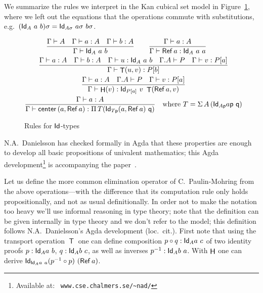 \documentclass[a4paper,USenglish,draft]{lipics}
\DeclareMathOperator{\Ref}{\mathsf{Ref}}
\DeclareMathOperator{\Transp}{\mathsf{T}}
\DeclareMathOperator{\HH}{{\sf H}}
\newcommand{\Id}{{\sf Id}}
\newcommand{\pp}{{\sf p}}
\newcommand{\qq}{{\sf q}}
\begin{document}
We summarize the rules we interpret in the Kan cubical set model in
Figure~\ref{fig:idtype}, where we left out the equations that the
operations commute with substitutions, e.g.\ $(\Id_A~a~b) \sigma =
\Id_{A \sigma}~a\sigma~ b\sigma$.
\begin{figure}[t]
  \caption{Rules for $\Id$-types\label{fig:idtype}}
  \begin{gather*}
    \frac {\Gamma \vdash A \quad \Gamma \vdash a : A \quad \Gamma \vdash
      b : A} {\Gamma \vdash \Id_A~a~b} \qquad
    \frac {\Gamma \vdash a : A} {\Gamma\vdash \Ref a:\Id_A~a~a} \qquad
    \\
    \frac {\Gamma\vdash a:A \quad \Gamma\vdash b:A \quad \Gamma\vdash
      u:\Id_A~a~b \quad \Gamma.A \vdash P \quad \Gamma\vdash v:P[a]}
    {\Gamma\vdash \Transp(u,v):P[b]}
    \\
    \frac {\Gamma \vdash a : A \quad \Gamma.A \vdash P \quad \Gamma
      \vdash v : P [a]} {\Gamma \vdash \HH
      (v):\Id_{P[a]}~v~\Transp(\Ref a,v)}
    \\
    \frac {\Gamma \vdash a : A} {\Gamma \vdash \mathsf{center}\, (a,
      \Ref a) : \Pi\, T (\Id_{T \pp} (a, \Ref a)~\qq) } \quad \text
    {where } T = \Sigma\,A\,(\Id_{A \pp} a \pp~ \qq)
  \end{gather*}
\end{figure}

N.A.~Danielsson has checked formally in Agda that these properties are
enough to develop all basic propositions of univalent mathematics;
this Agda development\footnote{Available at: {\tt
    www.cse.chalmers.se/\textasciitilde nad/}} is accompanying the
paper~\cite{CoquandDanielsson}.

Let us define the more common elimination operator of C.\
Paulin-Mohring from the above operations---with the difference that
its computation rule only holds propositionally, and not as usual
definitionally.  In order not to make the notation too heavy we'll use
informal reasoning in type theory; note that the definition can be
given internally in type theory and we don't refer to the model; this
definition follows N.A.\ Danielsson's Agda development (loc.\ cit.).
First note that using the transport operation $\Transp$ one can define
composition $p \circ q : \Id_A a~c$ of two identity proofs $p : \Id_A
a~b$, $q : \Id_A b~c$, as well as inverses $p^{-1} : \Id_A b~a$.  With
$\HH$ one can derive $\Id_{\Id_A a~a} (p^{-1} \circ p)~(\Ref a)$.
\end{document}
